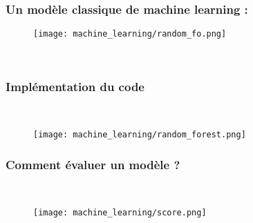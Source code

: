 \documentclass{beamer}
\theoremstyle{definition}
\begin{document}
\begin{frame}
	\frametitle{Un modèle classique de machine learning :}
	\begin{minipage}[t]{1\linewidth}

\begin{figure}
	\centering
	\texttt{[image: machine\_learning/random\_fo.png]}
	\caption*{}
	\label{fig:randomforest}		\centering
	\hfill\\[-0.8cm]
\end{figure}
		
	\end{minipage}	
\end{frame}

\begin{frame}
	\frametitle{Implémentation du code}
	\hfill\\[-1cm]
	\begin{minipage}[t]{1\linewidth}
			\centering
		\begin{figure}
			\centering
			\texttt{[image: machine\_learning/random\_forest.png]}
			\caption*{}
		\end{figure}
	\end{minipage}	
\end{frame}

\begin{frame}
	\frametitle{Comment évaluer un modèle ?}
	\hfill\\[-1cm]
	\begin{minipage}[t]{1\linewidth}
		\centering
		\begin{figure}
			\centering
			\texttt{[image: machine\_learning/score.png]}
			\caption*{}
		\end{figure}
	\end{minipage}	
\end{frame}
\end{document}
